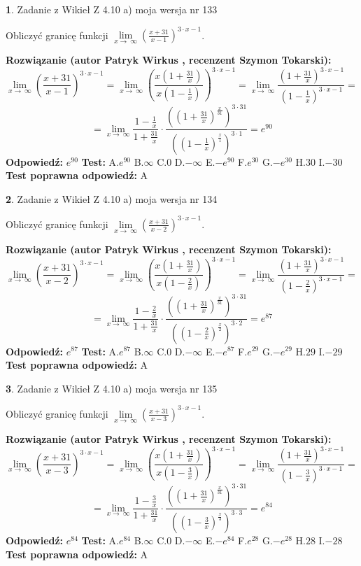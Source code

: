 \documentclass[12pt, a4paper]{article}
\theoremstyle{definition} %
\newtheorem{zad}{}
\newcommand{\zadStart}[1]{\begin{zad}#1\newline}
\newcommand{\zadStop}{\end{zad}}
\newcommand{\rozwStart}[2]{\noindent \textbf{Rozwiązanie (autor #1 , recenzent #2): }\newline}
\newcommand{\rozwStop}{\newline}
\newcommand{\odpStart}{\noindent \textbf{Odpowiedź:}\newline}
\newcommand{\odpStop}{\newline}
\newcommand{\testStart}{\noindent \textbf{Test:}\newline}
\newcommand{\testStop}{\newline}
\newcommand{\kluczStart}{\noindent \textbf{Test poprawna odpowiedź:}\newline}
\newcommand{\kluczStop}{\newline}
\begin{document}
\zadStart{Zadanie z Wikieł Z 4.10 a) moja wersja nr 133}

Obliczyć granicę funkcji  $\lim\limits_{x\to\ \infty}(\frac{x+31}{x-1})^{3\cdot x-1}$.
\zadStop
\rozwStart{Patryk Wirkus}{Szymon Tokarski}
$$\lim\limits_{x\to\ \infty}(\frac{x+31}{x-1})^{3\cdot x-1} = \lim\limits_{x\to\ \infty}(\frac{x(1+\frac{31}{x})}{x(1-\frac{1}{x})})^{3\cdot x-1}=\lim\limits_{x\to\ \infty}\frac{(1+\frac{31}{x})^{3\cdot x-1}}{(1-\frac{1}{x})^{3\cdot x-1}}=$$
$$=\lim\limits_{x\to\ \infty}\frac{1-\frac{1}{x}}{1+\frac{31}{x}}\cdot\frac{((1+\frac{31}{x})^{\frac{x}{31}})^{3\cdot31}}{((1-\frac{1}{x})^{\frac{x}{1}})^{3\cdot1}}=e^{90}$$
\rozwStop
\odpStart
$e^{90}$
\odpStop
\testStart
A.$e^{90}$ B.$\infty$ C.$0$ D.$-\infty$ E.$-e^{90}$
F.$e^{30}$ G.$-e^{30}$
H.$30$
I.$-30$
\testStop
\kluczStart
A
\kluczStop



\zadStart{Zadanie z Wikieł Z 4.10 a) moja wersja nr 134}

Obliczyć granicę funkcji  $\lim\limits_{x\to\ \infty}(\frac{x+31}{x-2})^{3\cdot x-1}$.
\zadStop
\rozwStart{Patryk Wirkus}{Szymon Tokarski}
$$\lim\limits_{x\to\ \infty}(\frac{x+31}{x-2})^{3\cdot x-1} = \lim\limits_{x\to\ \infty}(\frac{x(1+\frac{31}{x})}{x(1-\frac{2}{x})})^{3\cdot x-1}=\lim\limits_{x\to\ \infty}\frac{(1+\frac{31}{x})^{3\cdot x-1}}{(1-\frac{2}{x})^{3\cdot x-1}}=$$
$$=\lim\limits_{x\to\ \infty}\frac{1-\frac{2}{x}}{1+\frac{31}{x}}\cdot\frac{((1+\frac{31}{x})^{\frac{x}{31}})^{3\cdot31}}{((1-\frac{2}{x})^{\frac{x}{2}})^{3\cdot2}}=e^{87}$$
\rozwStop
\odpStart
$e^{87}$
\odpStop
\testStart
A.$e^{87}$ B.$\infty$ C.$0$ D.$-\infty$ E.$-e^{87}$
F.$e^{29}$ G.$-e^{29}$
H.$29$
I.$-29$
\testStop
\kluczStart
A
\kluczStop



\zadStart{Zadanie z Wikieł Z 4.10 a) moja wersja nr 135}

Obliczyć granicę funkcji  $\lim\limits_{x\to\ \infty}(\frac{x+31}{x-3})^{3\cdot x-1}$.
\zadStop
\rozwStart{Patryk Wirkus}{Szymon Tokarski}
$$\lim\limits_{x\to\ \infty}(\frac{x+31}{x-3})^{3\cdot x-1} = \lim\limits_{x\to\ \infty}(\frac{x(1+\frac{31}{x})}{x(1-\frac{3}{x})})^{3\cdot x-1}=\lim\limits_{x\to\ \infty}\frac{(1+\frac{31}{x})^{3\cdot x-1}}{(1-\frac{3}{x})^{3\cdot x-1}}=$$
$$=\lim\limits_{x\to\ \infty}\frac{1-\frac{3}{x}}{1+\frac{31}{x}}\cdot\frac{((1+\frac{31}{x})^{\frac{x}{31}})^{3\cdot31}}{((1-\frac{3}{x})^{\frac{x}{3}})^{3\cdot3}}=e^{84}$$
\rozwStop
\odpStart
$e^{84}$
\odpStop
\testStart
A.$e^{84}$ B.$\infty$ C.$0$ D.$-\infty$ E.$-e^{84}$
F.$e^{28}$ G.$-e^{28}$
H.$28$
I.$-28$
\testStop
\kluczStart
A
\kluczStop
\end{document}
